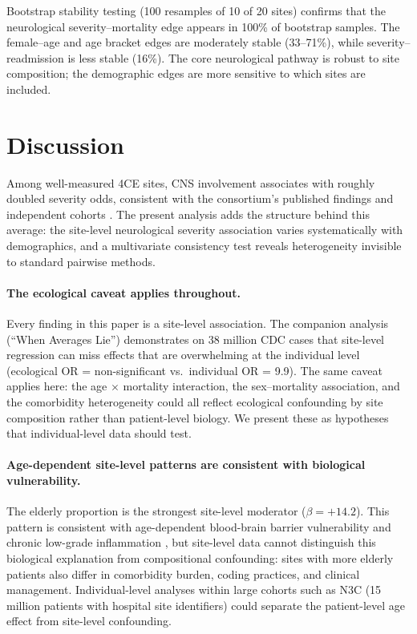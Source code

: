 \documentclass{article}
\begin{document}
Bootstrap stability testing (100 resamples of 10 of 20 sites) confirms that the neurological severity--mortality edge appears in 100\% of bootstrap samples.
The female--age and age bracket edges are moderately stable (33--71\%), while severity--readmission is less stable (16\%).
The core neurological pathway is robust to site composition; the demographic edges are more sensitive to which sites are included.


\section{Discussion}

Among well-measured 4CE sites, CNS involvement associates with roughly doubled severity odds, consistent with the consortium's published findings \cite{four_ce_neuro2021} and independent cohorts \cite{frontera2021neuro, mao2020neuro}.
The present analysis adds the structure behind this average: the site-level neurological severity association varies systematically with demographics, and a multivariate consistency test reveals heterogeneity invisible to standard pairwise methods.

\paragraph{The ecological caveat applies throughout.}
Every finding in this paper is a site-level association.
The companion analysis (``When Averages Lie'') demonstrates on 38 million CDC cases that site-level regression can miss effects that are overwhelming at the individual level (ecological OR = non-significant vs.\ individual OR = 9.9).
The same caveat applies here: the age $\times$ mortality interaction, the sex--mortality association, and the comorbidity heterogeneity could all reflect ecological confounding by site composition rather than patient-level biology.
We present these as hypotheses that individual-level data should test.

\paragraph{Age-dependent site-level patterns are consistent with biological vulnerability.}
The elderly proportion is the strongest site-level moderator ($\beta = +14.2$).
This pattern is consistent with age-dependent blood-brain barrier vulnerability \cite{montagne2015bbb} and chronic low-grade inflammation \cite{franceschi2018inflammaging}, but site-level data cannot distinguish this biological explanation from compositional confounding: sites with more elderly patients also differ in comorbidity burden, coding practices, and clinical management.
Individual-level analyses within large cohorts such as N3C (15 million patients with hospital site identifiers) could separate the patient-level age effect from site-level confounding.
\end{document}
